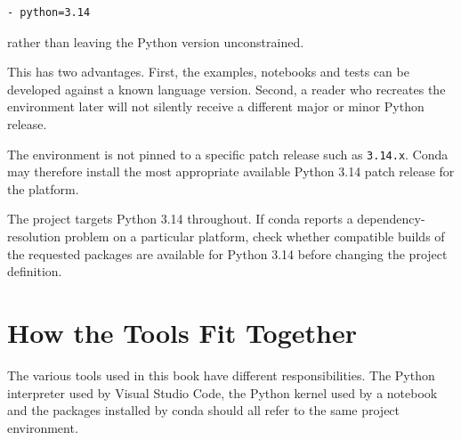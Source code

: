 \begin{verbatim}
- python=3.14
\end{verbatim}

rather than leaving the Python version unconstrained.

This has two advantages. First, the examples, notebooks and tests can
be developed against a known language version. Second, a reader who
recreates the environment later will not silently receive a different
major or minor Python release.

The environment is not pinned to a specific patch release such as
\texttt{3.14.x}. Conda may therefore install the most appropriate
available Python 3.14 patch release for the platform.

\begin{implementationnote}
The project targets Python 3.14 throughout. If conda reports a
dependency-resolution problem on a particular platform, check whether
compatible builds of the requested packages are available for Python
3.14 before changing the project definition.
\end{implementationnote}


\section{How the Tools Fit Together}
\label{sec:tools-together}

The various tools used in this book have different responsibilities.
The Python interpreter used by Visual Studio Code, the Python kernel
used by a notebook and the packages installed by conda should all
refer to the same project environment.

